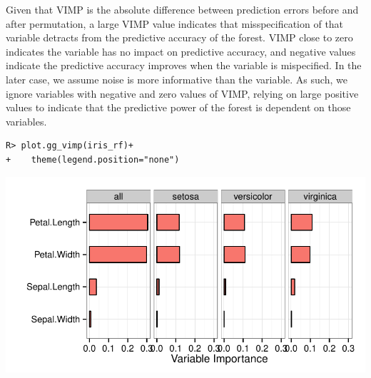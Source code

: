 \documentclass[nojss]{jss}\usepackage[]{graphicx}\usepackage[]{color}
\makeatletter
\def\maxwidth{ %
  \ifdim\Gin@nat@width>\linewidth
    \linewidth
  \else
    \Gin@nat@width
  \fi
}
\newenvironment{kframe}{%
 \def\at@end@of@kframe{}%
 \ifinner\ifhmode%
  \def\at@end@of@kframe{\end{minipage}}%
  \begin{minipage}{\columnwidth}%
 \fi\fi%
 \def\FrameCommand##1{\hskip\@totalleftmargin \hskip-\fboxsep
 \colorbox{shadecolor}{##1}\hskip-\fboxsep
     \hskip-\linewidth \hskip-\@totalleftmargin \hskip\columnwidth}%
 \MakeFramed {\advance\hsize-\width
   \@totalleftmargin\z@ \linewidth\hsize
   \@setminipage}}%
 {\par\unskip\endMakeFramed%
 \at@end@of@kframe}
\newenvironment{knitrout}{}{} %
\makeatother
\begin{document}
Given that VIMP is the absolute difference between prediction errors before and after permutation, a large VIMP value indicates that misspecification of that variable detracts from the predictive accuracy of the forest. VIMP close to zero indicates the variable has no impact on predictive accuracy, and negative values indicate the predictive accuracy improves when the variable is mispecified. In the later case, we assume noise is more informative than the variable. As such, we ignore variables with negative and zero values of VIMP, relying on large positive values to indicate that the predictive power of the forest is dependent on those variables. 
\begin{knitrout}\footnotesize
{}\color{fgcolor}\begin{kframe}
\begin{verbatim}
R> plot.gg_vimp(iris_rf)+
+    theme(legend.position="none")
\end{verbatim}
\end{kframe}

{\centering \includegraphics[width=\maxwidth]{figure/beamer-iris-vimp-1} 

}



\end{knitrout}
\end{document}
